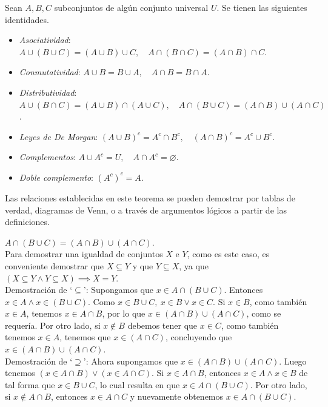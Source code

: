 \documentclass[12pt]{book}
\begin{document}
\begin{theoremenv}
     Sean $A,B,C$ subconjuntos de algún conjunto universal $U$. Se tienen las siguientes identidades.
    \begin{itemize}
        \item \textit{Asociatividad}: $A\cup (B\cup C)=(A\cup B)\cup C,\quad A\cap(B\cap C)=(A\cap B)\cap C$.
        \item \textit{Conmutatividad}: $A\cup B =B\cup A, \quad A\cap B=B\cap A$.
        \item \textit{Distributividad}: $A\cup(B\cap C)=(A\cup B)\cap (A\cup C), \quad A\cap (B\cup C)=(A\cap B)\cup(A\cap C)$.
        \item \textit{Leyes de De Morgan}: $(A\cup B)^c=A^c\cap B^c,\quad (A\cap B)^c=A^c\cup B^c$.
        \item \textit{Complementos}: $A\cup A^c=U,\quad A\cap A^c=\varnothing$.
        \item \textit{Doble complemento}: $(A^c)^c=A$.
    \end{itemize}
\end{theoremenv}

Las relaciones establecidas en este teorema se pueden demostrar por tablas de verdad, diagramas de Venn, o a través de argumentos lógicos a partir de las definiciones.

\begin{proofenv}
    $A\cap (B\cup C)=(A\cap B)\cup (A\cap C).$\\
    
    Para demostrar una igualdad de conjuntos $X$ e $Y$, como es este caso, es conveniente demostrar que $X\subseteq Y$ y que $Y\subseteq X$, ya que $(X\subseteq Y\wedge Y\subseteq X)\implies X=Y.$\\
    
    Demostración de `$\subseteq$': Supongamos que $x\in A\cap (B\cup C).$ Entonces $x\in A\wedge x\in (B\cup C).$ Como $x\in B\cup C,\  x\in B\vee x\in C$. Si $x\in B$, como también $x\in A$, tenemos $x\in A\cap B$, por lo que $x\in (A\cap B)\cup (A\cap C)$, como se requería. Por otro lado, si $x\notin B$ debemos tener que $x\in C$, como también tenemos $x\in A$, tenemos que $x\in (A\cap C)$, concluyendo que $x\in (A\cap B)\cup (A\cap C).$\\

    Demostración de `$\supseteq$': Ahora supongamos que $x\in (A\cap B)\cup (A\cap C).$ Luego tenemos $(x\in A\cap B)\vee (x\in A\cap C)$. Si $x\in A\cap B$, entonces $x\in A\wedge x\in B$ de tal forma que $x\in B\cup C$, lo cual resulta en que $x\in A\cap (B\cup C)$. Por otro lado, si $x\notin A\cap B$, entonces $x\in A\cap C$ y nuevamente obtenemos $x\in A\cap (B\cup C).$
\end{proofenv}
\end{document}
